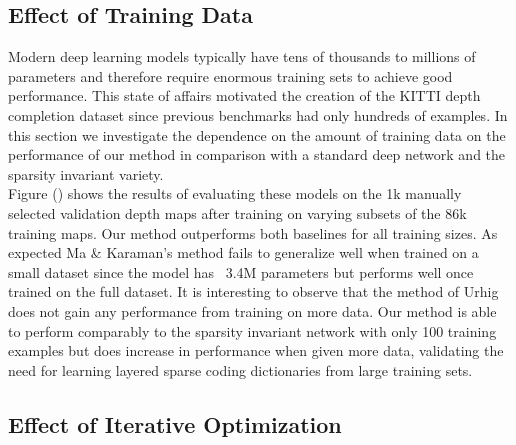 \subsection{Effect of Training Data}
\label{sec:effect-training-data}

Modern deep learning models typically have tens of thousands to millions of parameters and therefore require enormous training sets to achieve good performance. This state of affairs motivated the creation of the KITTI depth completion dataset since previous benchmarks had only hundreds of examples. In this section we investigate the dependence on the amount of training data on the performance of our method in comparison with a standard deep network and the sparsity invariant variety.\\

Figure () shows the results of evaluating these models on the 1k manually selected validation depth maps after training on varying subsets of the 86k training maps. Our method outperforms both baselines for all training sizes. As expected Ma \& Karaman's method fails to generalize well when trained on a small dataset since the model has ~3.4M parameters but performs well once trained on the full dataset. It is interesting to observe that the method of Urhig \etal does not gain any performance from training on more data. Our method is able to perform comparably to the sparsity invariant network with only 100 training examples but does increase in performance when given more data, validating the need for learning layered sparse coding dictionaries from large training sets.

\subsection{Effect of Iterative Optimization}
\label{sec:effect-iter-optim}

